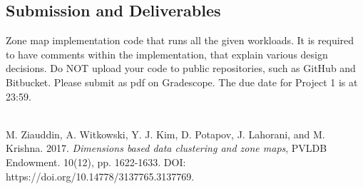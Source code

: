 \documentclass[12pt,a4paper,twoside]{article}
\newcommand{\assignmenttype}{Project}       %
\newcommand{\assignmentnumber}{1}           %
\begin{document}
\subsection*{Submission and Deliverables}
Zone map implementation code that runs all the given workloads. 
It is required to have comments within the implementation, that explain various design decisions. 
Do NOT upload your code to public repositories, such as GitHub and Bitbucket. 
Please submit as pdf on Gradescope. 
The due date for \assignmenttype{} \assignmentnumber{} is  at 23:59. \\\\



\begin{thebibliography}{9}
M. Ziauddin, A. Witkowski, Y. J. Kim, D. Potapov, J. Lahorani, and M. Krishna. 2017. \emph{Dimensions based data clustering and zone maps}, PVLDB Endowment. 10(12), pp. 1622-1633. DOI: https://doi.org/10.14778/3137765.3137769.
\end{thebibliography}
\end{document}
